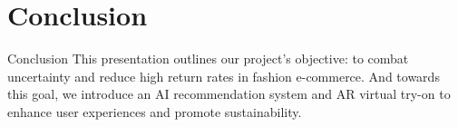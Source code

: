 \section{Conclusion}

\begin{frame}{Conclusion}
	This presentation outlines our project's objective: to combat uncertainty and reduce high return rates in fashion e-commerce. And towards this goal, we introduce an AI recommendation system and AR virtual try-on to enhance user experiences and promote sustainability.
\end{frame}